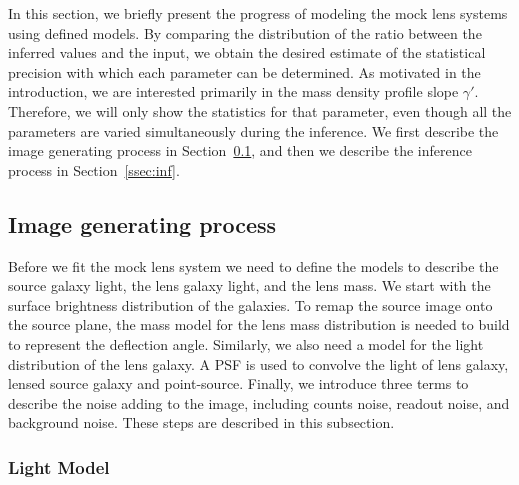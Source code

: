 \documentclass[a4paper,11pt]{article}
\begin{document}
In this section, we briefly present the progress of modeling the mock
lens systems using defined models. By comparing the distribution of
the ratio between the inferred values and the input, we obtain the
desired estimate of the statistical precision with which each
parameter can be determined. As motivated in the introduction, we are
interested primarily in the mass density profile slope
$\gamma'$. Therefore, we will only show the statistics for that
parameter, even though all the parameters are varied simultaneously
during the inference. We first describe the image generating process
in Section~\ref{ssec:image}, and then we describe the inference process in
Section~\ref{ssec:inf}.

\subsection{Image generating process}
\label{ssec:image}

Before we fit the mock lens system we need to define the models to
describe the source galaxy light, the lens galaxy light, and the lens
mass. We start with the surface brightness distribution of the
galaxies. To remap the source image onto the source plane, the mass
model for the lens mass distribution is needed to build to represent
the deflection angle. Similarly, we also need a model for the light
distribution of the lens galaxy. A PSF is used to convolve the light
of lens galaxy, lensed source galaxy and point-source. Finally, we
introduce three terms to describe the noise adding to the image,
including counts noise, readout noise, and background noise. These
steps are described in this subsection.

\subsubsection{Light Model}
\end{document}
